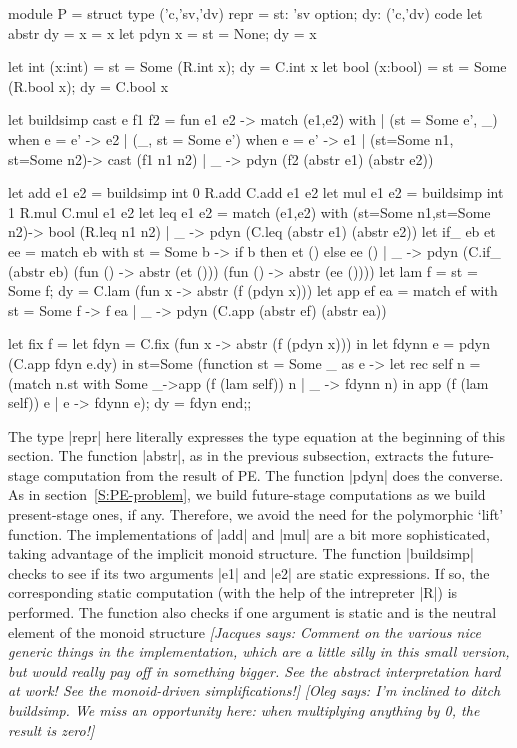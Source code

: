 \documentclass[preprint]{sigplanconf}
\newcommand{\jacques}[1]{{\it [Jacques says: #1]}}
\newcommand{\oleg}[1]{{\it [Oleg says: #1]}}
\begin{document}
\begin{code}
module P = struct
  type ('c,'sv,'dv) repr = 
        {st: 'sv option; dy: ('c,'dv) code}
  let abstr {dy = x} = x
  let pdyn x = {st = None; dy = x}

  let int  (x:int)  = {st = Some (R.int x); dy = C.int x}
  let bool (x:bool) = {st = Some (R.bool x); dy = C.bool x}

  let buildsimp cast e f1 f2 = fun e1 e2 -> 
     match (e1,e2) with
        | ({st = Some e'}, _) when e = e' -> e2
        | (_, {st = Some e'}) when e = e' -> e1
        | ({st=Some n1}, {st=Some n2})-> cast (f1 n1 n2)
        | _ -> pdyn (f2 (abstr e1) (abstr e2))

  let add e1 e2 = buildsimp int 0 R.add C.add e1 e2
  let mul e1 e2 = buildsimp int 1 R.mul C.mul e1 e2
  let leq e1 e2 = 
     match (e1,e2) with
         ({st=Some n1},{st=Some n2})-> bool (R.leq n1 n2)
        | _ -> pdyn (C.leq (abstr e1) (abstr e2))
  let if_ eb et ee = match eb with
           {st = Some b} -> if b then et () else ee ()
         | _ -> pdyn (C.if_ (abstr eb) 
                          (fun () -> abstr (et ()))
                          (fun () -> abstr (ee ())))
  let lam f = {st = Some f; 
               dy = C.lam (fun x -> abstr (f (pdyn x)))}
  let app ef ea = match ef with
        {st = Some f} -> f ea
      | _ -> pdyn (C.app (abstr ef) (abstr ea))

  let fix f = 
    let fdyn = C.fix (fun x -> abstr (f (pdyn x))) in
    let fdynn e = pdyn (C.app fdyn e.dy) in
    {st=Some (function {st = Some _} as e -> 
               let rec self n = 
                (match n.st with Some _->app (f (lam self)) n 
                                | _ -> fdynn n) in 
               app (f (lam self)) e
             | e  -> fdynn e);
    dy = fdyn }
end;;
\end{code}

The type |repr| here literally expresses the type equation at the
beginning of this section. The function |abstr|, as in the previous
subsection, extracts the future-stage computation from the result of
PE. The function |pdyn| does the converse. As in
section~\ref{S:PE-problem}, we build future-stage computations as we
build present-stage ones, if any. Therefore, we avoid the need for the
polymorphic `lift' function. The implementations of
|add| and |mul| are a bit more sophisticated, taking advantage of the
implicit monoid structure. The function |buildsimp| checks to see if
its two arguments |e1| and |e2| are static expressions. If so, the
corresponding static computation (with the help of the intrepreter
|R|) is performed. The function also checks if one argument is static
and is the neutral element of the monoid structure 
\jacques{Comment on the various nice generic things in the implementation,
which are a little silly in this small version, but would really pay off
in something bigger.  See the abstract interpretation hard at work!
See the monoid-driven simplifications!}
\oleg{I'm inclined to ditch buildsimp. We miss an opportunity here:
  when multiplying anything by 0, the result is zero!}
\end{document}
